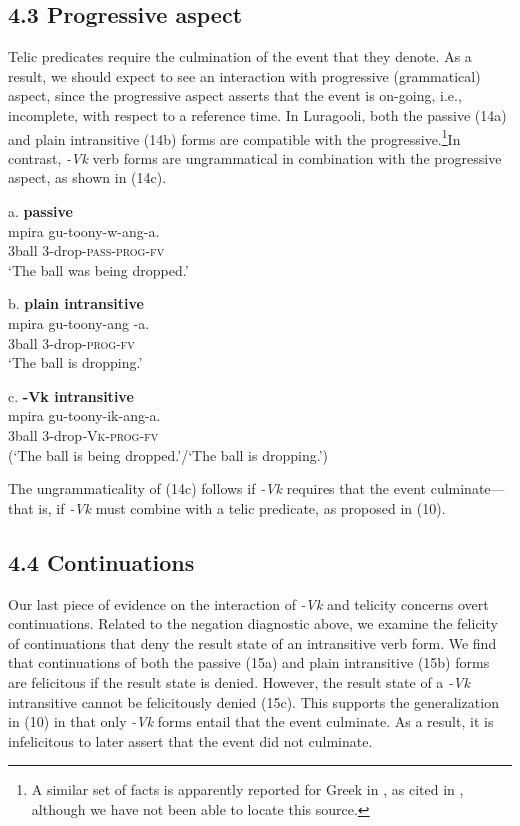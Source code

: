 \documentclass[output=paper]{langsci/langscibook}
\begin{document}
\subsection{4.3 Progressive aspect}

Telic predicates require the culmination of the event that they denote. As a result, we should expect to see an interaction with progressive (grammatical) aspect, since the progressive aspect asserts that the event is on-going, i.e., incomplete, with respect to a reference time. In Luragooli, both the passive (14a) and plain intransitive (14b) forms are compatible with the progressive.\footnote{ A similar set of facts is apparently reported for Greek in \citet{Mavromanolaki2002}, as cited in \citet{AlexiadouEtAl2015}, although we have not been able to locate this source. }In contrast, \textit{{}-Vk} verb forms are ungrammatical in combination with the progressive aspect, as shown in (14c).

\ea
{a. \textbf{passive}}\\
\gll mpira gu-toony-w-ang-a.\\
     3ball  3-drop-\textsc{pass}{}-\textsc{prog}{}-\textsc{fv}\\
\glt ‘The ball was being dropped.’
\z

\ea
{b.\textbf{ plain intransitive}}\\
\gll mpira gu-toony-ang -a.\\
     3ball  3-drop-\textsc{prog}{}-\textsc{fv}\\
\glt ‘The ball is dropping.’
\z

\ea
{c.\textbf{ -Vk intransitive}}\\
\gll *mpira gu-toony-ik-ang-a.\\
     \textit{ }3ball    3-drop\textit{{}-}\textsc{Vk}{}-\textsc{prog}{}-\textsc{fv}\\
\glt  (‘The ball is being dropped.’/‘The ball is dropping.’)
\z

The ungrammaticality of (14c) follows if \textit{{}-Vk} requires that the event culminate—that is, if \textit{{}-Vk} must combine with a telic predicate, as proposed in (10).

\subsection{4.4 Continuations}

Our last piece of evidence on the interaction of \textit{{}-Vk} and telicity concerns overt continuations. Related to the negation diagnostic above, we examine the felicity of continuations that deny the result state of an intransitive verb form. We find that continuations of both the passive (15a) and plain intransitive (15b) forms are felicitous if the result state is denied. However, the result state of a \textit{{}-Vk} intransitive cannot be felicitously denied (15c). This supports the generalization in (10) in that only \textit{{}-Vk} forms entail that the event culminate. As a result, it is infelicitous to later assert that the event did not culminate.
\end{document}

